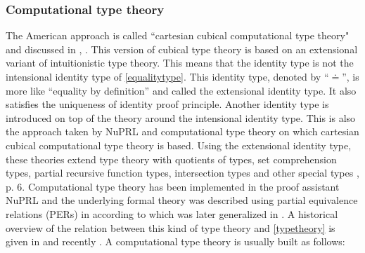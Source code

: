 \documentclass[12pt,a4paper,twoside,xetex]{book}
\begin{document}
\subsubsection{Computational type theory}

The American approach is called ``cartesian cubical computational type theory" 
and discussed in  \cite{Angiuli2017}, \cite{Angiuli2018}. This version of 
cubical type theory is based on an extensional variant of intuitionistic type 
theory. This means that the identity type is not the intensional identity type 
of \cref{equalitytype}. This identity type, denoted by ``$\doteq$'', is more 
like ``equality by definition'' and called the extensional identity type. It 
also satisfies the uniqueness of identity proof principle. Another identity 
type is introduced on top of the theory around the intensional identity type. 
This is also the approach taken by NuPRL and computational type theory on which 
cartesian cubical computational type theory is based. Using the extensional 
identity type, these theories extend type theory with quotients of types, set 
comprehension types, partial recursive function types, intersection types and 
other special types \cite{Constable2011}, p. 6.  Computational type theory has 
been implemented in the proof assistant NuPRL and the underlying formal theory 
was described using partial equivalence relations (PERs) in \cite{Allen1987} 
according to \cite{Angiuli2018} which was later generalized in 
\cite{Harper1991}. A historical overview of the relation between this kind of 
type theory and \cref{typetheory} is given in \cite{Constable2003} and recently 
\cite{Constable2015July}. A computational type theory is usually built as 
follows:
\end{document}
